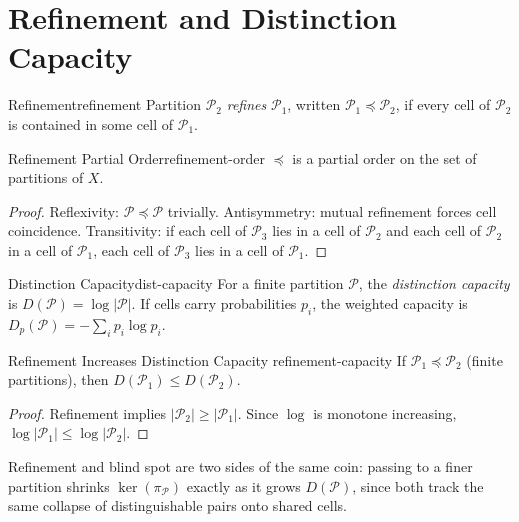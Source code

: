 \documentclass[12pt,twoside,openright]{book}
\newcommand{\partition}{\mathcal{P}}
\begin{document}
\section{Refinement and Distinction Capacity}
\label{sec:ch1-refinement}

\begin{definition}{Refinement}{refinement}
  Partition $\partition_2$ \emph{refines} $\partition_1$,
  written $\partition_1 \preceq \partition_2$, if every
  cell of $\partition_2$ is contained in some cell of
  $\partition_1$. 
\end{definition}

\begin{proposition}{Refinement Partial Order}{refinement-order}
  $\preceq$ is a partial order on the set of partitions
  of $X$.
\end{proposition}

\begin{proof}
  Reflexivity: $\partition \preceq \partition$ trivially.
  Antisymmetry: mutual refinement forces cell coincidence.
  Transitivity: if each cell of $\partition_3$ lies in a
  cell of $\partition_2$ and each cell of $\partition_2$
  in a cell of $\partition_1$, each cell of $\partition_3$
  lies in a cell of $\partition_1$.
\end{proof}

\begin{definition}{Distinction Capacity}{dist-capacity}
  For a finite partition $\partition$, the
  \emph{distinction capacity} is
  $D(\partition) = \log |\partition|$.
  If cells carry probabilities $p_i$, the weighted
  capacity is $D_p(\partition) = -\sum_i p_i \log p_i$.
\end{definition}

\begin{theorem}{Refinement Increases Distinction Capacity}%
  {refinement-capacity}
  If $\partition_1 \preceq \partition_2$ (finite
  partitions), then $D(\partition_1) \le D(\partition_2)$.
\end{theorem}

\begin{proof}
  Refinement implies $|\partition_2| \ge |\partition_1|$.
  Since $\log$ is monotone increasing,
  $\log|\partition_1| \le \log|\partition_2|$.
\end{proof}

Refinement and blind spot are two sides of the same
coin: passing to a finer partition shrinks
$\ker(\pi_\partition)$ exactly as it grows
$D(\partition)$, since both track the same collapse of
distinguishable pairs onto shared
cells.
\end{document}

